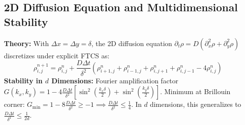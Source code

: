 \documentclass{article}
\begin{document}
\subsection{2D Diffusion Equation and Multidimensional Stability}
\textbf{Theory:} With $\Delta x = \Delta y = \delta$, the 2D diffusion equation $\partial_t \rho = D (\partial_x^2 \rho + \partial_y^2 \rho)$ discretizes under explicit FTCS as:
$$\rho_{i, j}^{n+1} = \rho_{i, j}^n + \frac{D \Delta t}{\delta^2} \left( \rho_{i+1, j}^n + \rho_{i-1, j}^n + \rho_{i, j+1}^n + \rho_{i, j-1}^n - 4\rho_{i, j}^n \right)$$
\textbf{Stability in $d$ Dimensions:} Fourier amplification factor $G(k_x, k_y) = 1 - 4 \frac{D \Delta t}{\delta^2} [\sin^2(\frac{k_x \delta}{2}) + \sin^2(\frac{k_y \delta}{2})]$. Minimum at Brillouin corner: $G_{\min} = 1 - 8 \frac{D \Delta t}{\delta^2} \ge -1 \implies \frac{D \Delta t}{\delta^2} \le \frac{1}{4}$. In $d$ dimensions, this generalizes to $\frac{D \Delta t}{\delta^2} \le \frac{1}{2d}$.
\end{document}
